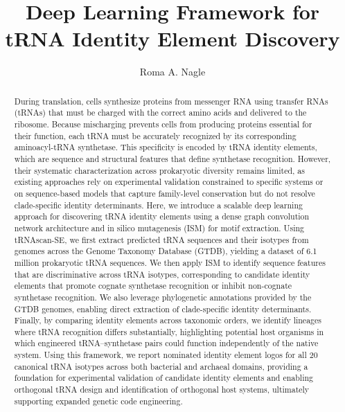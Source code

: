 \documentclass{article}
\title{\textbf{Deep Learning Framework for tRNA Identity Element Discovery}}
\author{
Roma A. Nagle
}
\begin{document}
\maketitle

\begin{abstract}
During translation, cells synthesize proteins from messenger RNA using transfer RNAs (tRNAs) that must be charged with the correct amino acids and delivered to the ribosome. Because mischarging prevents cells from producing proteins essential for their function, each tRNA must be accurately recognized by its corresponding aminoacyl-tRNA synthetase. This specificity is encoded by tRNA identity elements, which are sequence and structural features that define synthetase recognition. However, their systematic characterization across prokaryotic diversity remains limited, as existing approaches rely on experimental validation constrained to specific systems or on sequence-based models that capture family-level conservation but do not resolve clade-specific identity determinants. Here, we introduce a scalable deep learning approach for discovering tRNA identity elements using a dense graph convolution network architecture and in silico mutagenesis (ISM) for motif extraction. Using tRNAscan-SE, we first extract predicted tRNA sequences and their isotypes from genomes across the Genome Taxonomy Database (GTDB), yielding a dataset of 6.1 million prokaryotic tRNA sequences. We then apply ISM to identify sequence features that are discriminative across tRNA isotypes, corresponding to candidate identity elements that promote cognate synthetase recognition or inhibit non-cognate synthetase recognition. We also leverage phylogenetic annotations provided by the GTDB genomes, enabling direct extraction of clade-specific identity determinants. Finally, by comparing identity elements across taxonomic orders, we identify lineages where tRNA recognition differs substantially, highlighting potential host organisms in which engineered tRNA–synthetase pairs could function independently of the native system. Using this framework, we report nominated identity element logos for all 20 canonical tRNA isotypes across both bacterial and archaeal domains, providing a foundation for experimental validation of candidate identity elements and enabling orthogonal tRNA design and identification of orthogonal host systems, ultimately supporting expanded genetic code engineering.
\end{abstract}
\end{document}
